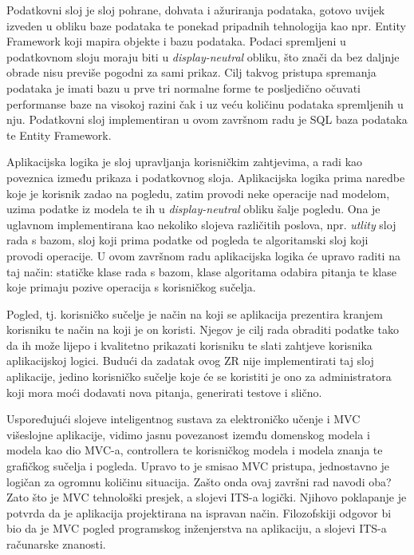 \documentclass[times, utf8, zavrsni]{fer}
\begin{document}
\par
Podatkovni sloj je sloj pohrane, dohvata i ažuriranja podataka, gotovo uvijek izveden u obliku baze podataka te ponekad pripadnih tehnologija kao npr. Entity Framework koji mapira objekte i bazu podataka. Podaci spremljeni u podatkovnom sloju moraju biti u \textit{display-neutral} obliku, što znači da bez daljnje obrade nisu previše pogodni za sami prikaz. Cilj takvog pristupa spremanja podataka je imati bazu u prve tri normalne forme te posljedično očuvati performanse baze na visokoj razini čak i uz veću količinu podataka spremljenih u nju. Podatkovni sloj implementiran u ovom završnom radu je SQL baza podataka te Entity Framework.
\par
Aplikacijska logika je sloj upravljanja korisničkim zahtjevima, a radi kao poveznica između prikaza i podatkovnog sloja. Aplikacijska logika prima naredbe koje je korisnik zadao na pogledu, zatim provodi neke operacije nad modelom, uzima podatke iz modela te ih u \textit{display-neutral} obliku šalje pogledu. Ona je uglavnom implementirana kao nekoliko slojeva različitih poslova, npr. \textit{utlity} sloj rada s bazom, sloj koji prima podatke od pogleda te algoritamski sloj koji provodi operacije. U ovom završnom radu aplikacijska logika će upravo raditi na taj način: statičke klase rada s bazom, klase algoritama odabira pitanja te klase koje primaju pozive operacija s korisničkog sučelja.
\par
Pogled, tj. korisničko sučelje je način na koji se aplikacija prezentira kranjem korisniku te način na koji je on koristi. Njegov je cilj rada obraditi podatke tako da ih može lijepo i kvalitetno prikazati korisniku te slati zahtjeve korisnika aplikacijskoj logici. Budući da zadatak ovog ZR nije implementirati taj sloj aplikacije, jedino korisničko sučelje koje će se koristiti je ono za administratora koji mora moći dodavati nova pitanja, generirati testove i slično.
\par
Uspoređujući slojeve inteligentnog sustava za elektroničko učenje i MVC višeslojne aplikacije, vidimo jasnu povezanost izemđu domenskog modela i modela kao dio MVC-a, controllera te korisničkog modela i modela znanja te grafičkog sučelja i pogleda. Upravo to je smisao MVC pristupa, jednostavno je logičan za ogromnu količinu situacija. Zašto onda ovaj završni rad navodi oba? Zato što je MVC tehnološki presjek, a slojevi ITS-a logički. Njihovo poklapanje je potvrda da je aplikacija projektirana na ispravan način. Filozofskiji odgovor bi bio da je MVC pogled programskog inženjerstva na aplikaciju, a slojevi ITS-a računarske znanosti.
\end{document}
